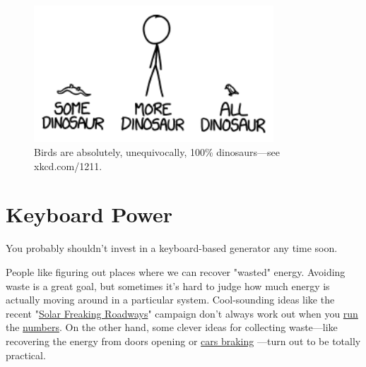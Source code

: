 {\begin{figure}[!htbp]
\centering
\includegraphics[scale=0.5, max width=0.8\textwidth]{imgs/a/101/you.png}
\caption{Birds are absolutely, unequivocally, 100\% dinosaurs—see xkcd.com/1211.}
\end{figure}

{
\chapter{Keyboard Power}
}

\hfill{}

{You probably shouldn't invest in a keyboard-based generator any time soon.}

{People like figuring out places where we can recover "wasted" energy. Avoiding waste is a great goal, but sometimes it's hard to judge how much energy is actually moving around in a particular system. Cool-sounding ideas like the recent "\href{https://www.youtube.com/watch?v=qlTA3rnpgzU\#t=15}{Solar Freaking Roadways}" campaign don't always work out when you \href{http://jalopnik.com/why-the-solar-roadway-is-a-terrible-idea-1582519375}{run} the \href{http://www.extremetech.com/extreme/183130-solar-roadways-passes-1-4-million-in-crowdfunding-just-short-of-the-56-trillion-required-but-not-bad-for-a-crazy-idea}{numbers}. On the other hand, some clever ideas for collecting waste—like recovering the energy from doors opening or \href{https://en.wikipedia.org/wiki/Regenerative\_brake}{cars braking} —turn out to be totally practical.}

}
